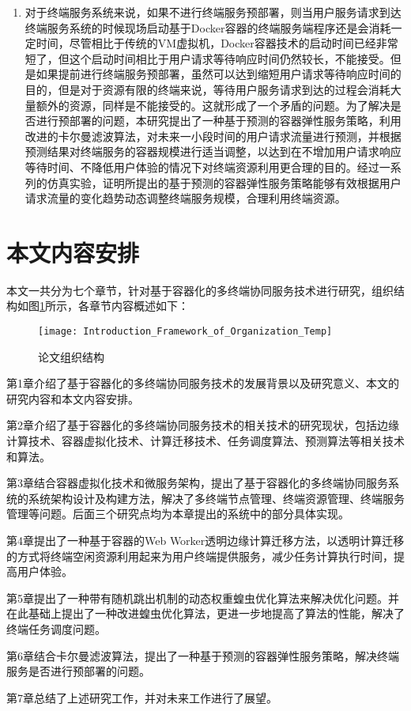 \begin{enumerate}
    \item 对于终端服务系统来说，如果不进行终端服务预部署，则当用户服务请求到达终端服务系统的时候现场启动基于Docker容器的终端服务端程序还是会消耗一定时间，尽管相比于传统的VM虚拟机，Docker容器技术的启动时间已经非常短了，但这个启动时间相比于用户请求等待响应时间仍然较长，不能接受。但是如果提前进行终端服务预部署，虽然可以达到缩短用户请求等待响应时间的目的，但是对于资源有限的终端来说，等待用户服务请求到达的过程会消耗大量额外的资源，同样是不能接受的。这就形成了一个矛盾的问题。为了解决是否进行预部署的问题，本研究提出了一种基于预测的容器弹性服务策略，利用改进的卡尔曼滤波算法，对未来一小段时间的用户请求流量进行预测，并根据预测结果对终端服务的容器规模进行适当调整，以达到在不增加用户请求响应等待时间、不降低用户体验的情况下对终端资源利用更合理的目的。经过一系列的仿真实验，证明所提出的基于预测的容器弹性服务策略能够有效根据用户请求流量的变化趋势动态调整终端服务规模，合理利用终端资源。
\end{enumerate}
\section{本文内容安排}
本文一共分为七个章节，针对基于容器化的多终端协同服务技术进行研究，组织结构如图\ref{fig:introduction_framework_of_organization}所示，各章节内容概述如下：
\begin{figure}[!htbp]
    \centering
    \texttt{[image: Introduction\_Framework\_of\_Organization\_Temp]}
    \caption{论文组织结构}
    \label{fig:introduction_framework_of_organization}
\end{figure}


第1章介绍了基于容器化的多终端协同服务技术的发展背景以及研究意义、本文的研究内容和本文内容安排。

第2章介绍了基于容器化的多终端协同服务技术的相关技术的研究现状，包括边缘计算技术、容器虚拟化技术、计算迁移技术、任务调度算法、预测算法等相关技术和算法。

第3章结合容器虚拟化技术和微服务架构，提出了基于容器化的多终端协同服务系统的系统架构设计及构建方法，解决了多终端节点管理、终端资源管理、终端服务管理等问题。后面三个研究点均为本章提出的系统中的部分具体实现。

第4章提出了一种基于容器的Web Worker透明边缘计算迁移方法，以透明计算迁移的方式将终端空闲资源利用起来为用户终端提供服务，减少任务计算执行时间，提高用户体验。

第5章提出了一种带有随机跳出机制的动态权重蝗虫优化算法来解决优化问题。并在此基础上提出了一种改进蝗虫优化算法，更进一步地提高了算法的性能，解决了终端任务调度问题。

第6章结合卡尔曼滤波算法，提出了一种基于预测的容器弹性服务策略，解决终端服务是否进行预部署的问题。

第7章总结了上述研究工作，并对未来工作进行了展望。
